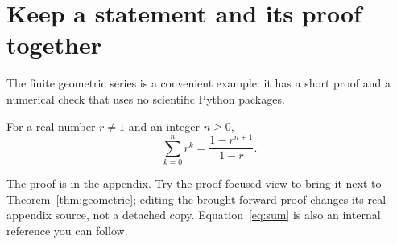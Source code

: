 \section{Keep a statement and its proof together}\label{sec:result}
The finite geometric series is a convenient example: it has a short proof and
a numerical check that uses no scientific Python packages.

\begin{theorem}\label{thm:geometric}
For a real number $r\ne1$ and an integer $n\ge0$,
\begin{equation}\label{eq:sum}
\sum_{k=0}^{n}r^k=\frac{1-r^{n+1}}{1-r}.
\end{equation}
\end{theorem}

The proof is in the appendix. Try the proof-focused view to bring it next to
Theorem~\ref{thm:geometric}; editing the brought-forward proof changes its real
appendix source, not a detached copy. Equation~\eqref{eq:sum} is also an internal
reference you can follow.
